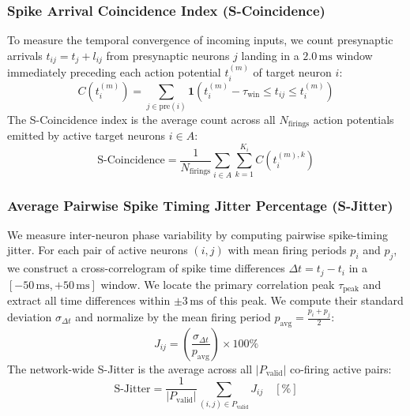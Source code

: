 \subsubsection{Spike Arrival Coincidence Index (S-Coincidence)}
To measure the temporal convergence of incoming inputs, we count presynaptic arrivals $t_{ij} = t_j + l_{ij}$ from presynaptic neurons $j$ landing in a $2.0\,\text{ms}$ window immediately preceding each action potential $t_i^{(m)}$ of target neuron $i$:
\begin{equation}
C\left(t_i^{(m)}\right) = \sum_{j \in \text{pre}(i)} \mathbf{1}\left( t_i^{(m)} - \tau_{\text{win}} \le t_{ij} \le t_i^{(m)} \right)
\end{equation}
The S-Coincidence index is the average count across all $N_{\text{firings}}$ action potentials emitted by active target neurons $i \in A$:
\begin{equation}
\text{S-Coincidence} = \frac{1}{N_{\text{firings}}} \sum_{i \in A} \sum_{k=1}^{K_i} C\left(t_i^{(m), k}\right)
\end{equation}

\subsubsection{Average Pairwise Spike Timing Jitter Percentage (S-Jitter)}
We measure inter-neuron phase variability by computing pairwise spike-timing jitter. For each pair of active neurons $(i, j)$ with mean firing periods $p_i$ and $p_j$, we construct a cross-correlogram of spike time differences $\Delta t = t_j - t_i$ in a $[-50\,\text{ms}, +50\,\text{ms}]$ window. We locate the primary correlation peak $\tau_{\text{peak}}$ and extract all time differences within $\pm 3\,\text{ms}$ of this peak. We compute their standard deviation $\sigma_{\Delta t}$ and normalize by the mean firing period $p_{\text{avg}} = \frac{p_i + p_j}{2}$:
\begin{equation}
J_{ij} = \left( \frac{\sigma_{\Delta t}}{p_{\text{avg}}} \right) \times 100\%
\end{equation}
The network-wide S-Jitter is the average across all $|P_{\text{valid}}|$ co-firing active pairs:
\begin{equation}
\text{S-Jitter} = \frac{1}{|P_{\text{valid}}|} \sum_{(i,j) \in P_{\text{valid}}} J_{ij} \quad [\%]
\end{equation}
